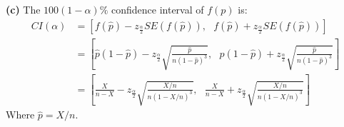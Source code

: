 \documentclass[a4paper, 10pt]{article}
\theoremstyle{definition}
\theoremstyle{hSol}
\begin{document}
\textbf{(c)}
The $100(1-\alpha)\%$ confidence interval of $f(p)$ is:
\begin{equation}
\begin{split}
  CI(\alpha) &= \left[f(\hat{p})-z_{\frac{\alpha}{2}}SE(f(\hat{p})),~~~ f(\hat{p})+z_{\frac{\alpha}{2}}SE(f(\hat{p}))\right] \\
  &=\left[\hat{p}(1-\hat{p})-z_{\frac{\alpha}{2}}\sqrt{\frac{\hat{p}}{n(1-\hat{p})^3}},~~~ \hat{p}(1-\hat{p})+z_{\frac{\alpha}{2}}\sqrt{\frac{\hat{p}}{n(1-\hat{p})^3}}\right]\\
  &=\left[\frac{X}{n-X}-z_{\frac{\alpha}{2}}\sqrt{\frac{X/n}{n(1-X/n)^3}},~~~ \frac{X}{n-X}+z_{\frac{\alpha}{2}}\sqrt{\frac{X/n}{n(1-X/n)^3}}\right]
\end{split}
\end{equation}
Where $\hat{p} = X/n$.
\end{document}
